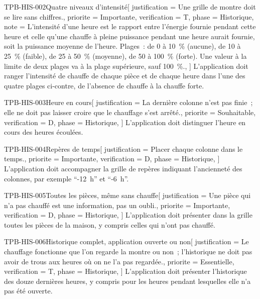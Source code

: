 \begin{exigence}{TPB-HIS-002}{Quatre niveaux d'intensité}[
    justification = {Une grille de montre doit se lire sans chiffres.},
    priorite      = {Importante},
    verification  = {T},
    phase         = {Historique},
    note          = {L'intensité d'une heure est le rapport entre l'énergie fournie pendant
                     cette heure et celle qu'une chauffe à pleine puissance pendant une
                     heure aurait fournie, soit la puissance moyenne de l'heure. Plages~:
                     de 0 à 10~\% (aucune), de 10 à 25~\% (faible), de 25 à 50~\% (moyenne),
                     de 50 à 100~\% (forte). Une valeur à la limite de deux plages va à la
                     plage supérieure, sauf 100~\%.},
  ]
  L'application doit ranger l'intensité de chauffe de chaque pièce et de chaque heure dans
  l'une des quatre plages ci-contre, de l'absence de chauffe à la chauffe forte.
\end{exigence}

\begin{exigence}{TPB-HIS-003}{Heure en cours}[
    justification = {La dernière colonne n'est pas finie~; elle ne doit pas laisser croire
                     que le chauffage s'est arrêté.},
    priorite      = {Souhaitable},
    verification  = {D},
    phase         = {Historique},
  ]
  L'application doit distinguer l'heure en cours des heures écoulées.
\end{exigence}

\begin{exigence}{TPB-HIS-004}{Repères de temps}[
    justification = {Placer chaque colonne dans le temps.},
    priorite      = {Importante},
    verification  = {D},
    phase         = {Historique},
  ]
  L'application doit accompagner la grille de repères indiquant l'ancienneté des
  colonnes, par exemple \enquote{-12~h} et \enquote{-6~h}.
\end{exigence}

\begin{exigence}{TPB-HIS-005}{Toutes les pièces, même sans chauffe}[
    justification = {Une pièce qui n'a pas chauffé est une information, pas un oubli.},
    priorite      = {Importante},
    verification  = {D},
    phase         = {Historique},
  ]
  L'application doit présenter dans la grille toutes les pièces de la maison, y compris
  celles qui n'ont pas chauffé.
\end{exigence}

\begin{exigence}{TPB-HIS-006}{Historique complet, application ouverte ou non}[
    justification = {Le chauffage fonctionne que l'on regarde la montre ou non~; l'historique
                     ne doit pas avoir de trous aux heures où on ne l'a pas regardée.},
    priorite      = {Essentielle},
    verification  = {T},
    phase         = {Historique},
  ]
  L'application doit présenter l'historique des douze dernières heures, y compris pour les
  heures pendant lesquelles elle n'a pas été ouverte.
\end{exigence}

